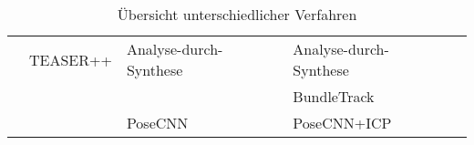 \documentclass[a4paper, 11pt]{article}
\begin{document}
\begin{table}
\begin{tabular}{p{1.5cm}|l|l|l|l}
                                              & TEASER++\cite{Teaser++}               & Analyse-durch-Synthese \cite{CategoryLevelObject} & Analyse-durch-Synthese \cite{CategoryLevelObject} &                                             \\
                                              &                                       &                                                   & BundleTrack\cite{BundleTrack}                     &                                             \\
                                              &                                       & PoseCNN\cite{PoseCNN}                             & PoseCNN\cite{PoseCNN}+ICP\cite{ICP}               &                                             \\
    \end{tabular}
    \caption{Übersicht unterschiedlicher Verfahren}
    \label{ubersicht}
\end{table}

\medskip

\printglossary[title=Glossar]

\printbibliography[title=Literatur]
\end{document}
